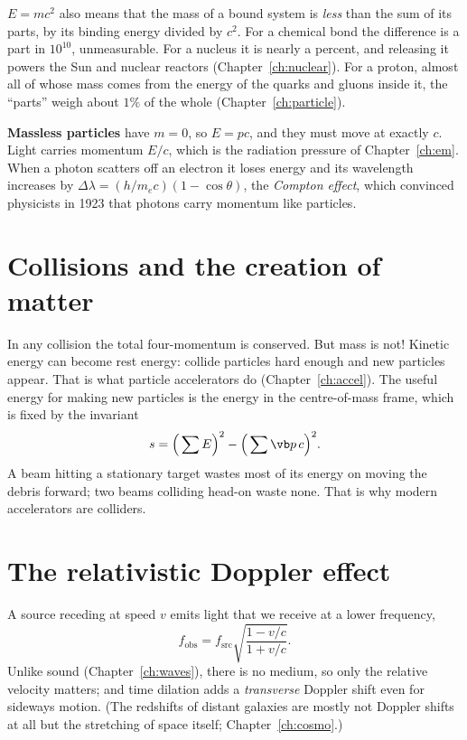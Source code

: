 $E=mc^2$ also means that the mass of a bound system is \emph{less} than the sum of its parts, by its binding energy divided by $c^2$. For a chemical bond the difference is a part in $10^{10}$, unmeasurable. For a nucleus it is nearly a percent, and releasing it powers the Sun and nuclear reactors (Chapter~\ref{ch:nuclear}). For a proton, almost all of whose mass comes from the energy of the quarks and gluons inside it, the ``parts'' weigh about $1\%$ of the whole (Chapter~\ref{ch:particle}).

\textbf{Massless particles} have $m = 0$, so $E = pc$, and they must move at exactly $c$. Light carries momentum $E/c$, which is the radiation pressure of Chapter~\ref{ch:em}. When a photon scatters off an electron it loses energy and its wavelength increases by $\Delta\lambda = (h/m_ec)(1-\cos\theta)$, the \emph{Compton effect}, which convinced physicists in 1923 that photons carry momentum like particles.

\section{Collisions and the creation of matter}

In any collision the total four-momentum is conserved. But mass is not! Kinetic energy can become rest energy: collide particles hard enough and new particles appear. That is what particle accelerators do (Chapter~\ref{ch:accel}). The useful energy for making new particles is the energy in the centre-of-mass frame, which is fixed by the invariant
\[
  s = \Big(\sum E\Big)^2 - \Big(\sum\vb p\,c\Big)^2 .
\]
A beam hitting a stationary target wastes most of its energy on moving the debris forward; two beams colliding head-on waste none. That is why modern accelerators are colliders.

\section{The relativistic Doppler effect}

A source receding at speed $v$ emits light that we receive at a lower frequency,
\[
  f_{\text{obs}} = f_{\text{src}}\sqrt{\frac{1-v/c}{1+v/c}}.
\]
Unlike sound (Chapter~\ref{ch:waves}), there is no medium, so only the relative velocity matters; and time dilation adds a \emph{transverse} Doppler shift even for sideways motion. (The redshifts of distant galaxies are mostly not Doppler shifts at all but the stretching of space itself; Chapter~\ref{ch:cosmo}.)

